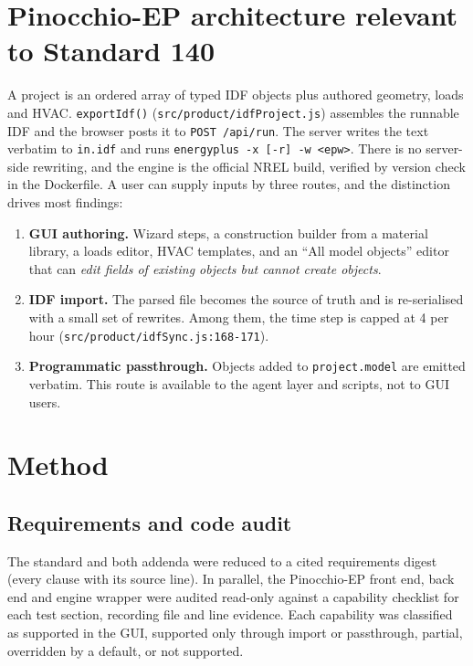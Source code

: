 \documentclass[10pt,a4paper]{article}
\newcommand{\code}[1]{\texttt{\small #1}}
\begin{document}
\section{Pinocchio-EP architecture relevant to Standard 140}\label{sec:pin}
A project is an ordered array of typed IDF objects plus authored geometry, loads and HVAC. \code{exportIdf()}
(\code{src/product/idfProject.js}) assembles the runnable IDF and the browser posts it to \code{POST /api/run}. The
server writes the text verbatim to \code{in.idf} and runs \code{energyplus -x [-r] -w <epw>}. There is no
server-side rewriting, and the engine is the official NREL build, verified by version check in the Dockerfile.
A user can supply inputs by three routes, and the distinction drives most findings:
\begin{enumerate}
\item \textbf{GUI authoring.} Wizard steps, a construction builder from a material library, a loads editor, HVAC
templates, and an ``All model objects'' editor that can \emph{edit fields of existing objects but cannot create
objects}.
\item \textbf{IDF import.} The parsed file becomes the source of truth and is re-serialised with a small set of
rewrites. Among them, the time step is capped at 4 per hour (\code{src/product/idfSync.js:168-171}).
\item \textbf{Programmatic passthrough.} Objects added to \code{project.model} are emitted verbatim. This route is
available to the agent layer and scripts, not to GUI users.
\end{enumerate}

\section{Method}\label{sec:method}
\subsection{Requirements and code audit}
The standard and both addenda were reduced to a cited requirements digest (every clause with its source line). In
parallel, the Pinocchio-EP front end, back end and engine wrapper were audited read-only against a capability
checklist for each test section, recording file and line evidence. Each capability was classified as supported in
the GUI, supported only through import or passthrough, partial, overridden by a default, or not supported.
\end{document}
